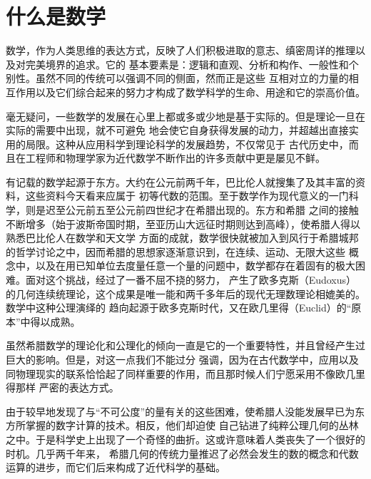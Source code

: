 


\chapter*{什么是数学}

数学，作为人类思维的表达方式，反映了人们积极进取的意志、缜密周详的推理以及对完美境界的追求。它的
基本要素是：逻辑和直观、分析和构作、一般性和个别性。虽然不同的传统可以强调不同的侧面，然而正是这些
互相对立的力量的相互作用以及它们综合起来的努力才构成了数学科学的生命、用途和它的崇高价值。

毫无疑问，一些数学的发展在心里上都或多或少地是基于实际的。但是理论一旦在实际的需要中出现，就不可避免
地会使它自身获得发展的动力，并超越出直接实用的局限。这种从应用科学到理论科学的发展趋势，不仅常见于
古代历史中，而且在工程师和物理学家为近代数学不断作出的许多贡献中更是屡见不鲜。

有记载的数学起源于东方。大约在公元前两千年，巴比伦人就搜集了及其丰富的资料，这些资料今天看来应属于
初等代数的范围。至于数学作为现代意义的一门科学，则是迟至公元前五至公元前四世纪才在希腊出现的。东方和希腊
之间的接触不断增多（始于波斯帝国时期，至亚历山大远征时期则达到高峰），使希腊人得以熟悉巴比伦人在数学和天文学
方面的成就，数学很快就被加入到风行于希腊城邦的哲学讨论之中，因而希腊的思想家逐渐意识到，在连续、运动、无限大这些
概念中，以及在用已知单位去度量任意一个量的问题中，数学都存在着固有的极大困难。面对这个挑战，经过了一番不屈不挠的努力，
产生了欧多克斯（Eudoxus）的几何连续统理论，这个成果是唯一能和两千多年后的现代无理数理论相媲美的。数学中这种公理演绎的
趋向起源于欧多克斯时代，又在欧几里得（Euclid）的“原本”中得以成熟。

虽然希腊数学的理论化和公理化的倾向一直是它的一个重要特性，并且曾经产生过巨大的影响。但是，对这一点我们不能过分
强调，因为在古代数学中，应用以及同物理现实的联系恰恰起了同样重要的作用，而且那时候人们宁愿采用不像欧几里得那样
严密的表达方式。

由于较早地发现了与“不可公度”的量有关的这些困难，使希腊人没能发展早已为东方所掌握的数字计算的技术。相反，他们却迫使
自己钻进了纯粹公理几何的丛林之中。于是科学史上出现了一个奇怪的曲折。这或许意味着人类丧失了一个很好的时机。几乎两千年来，
希腊几何的传统力量推迟了必然会发生的数的概念和代数运算的进步，而它们后来构成了近代科学的基础。

